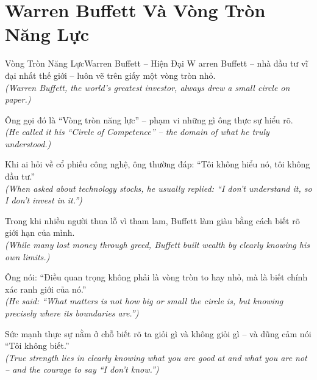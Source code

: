 \section{Warren Buffett Và Vòng Tròn Năng Lực}
\begin{truyen}{Vòng Tròn Năng Lực}{Warren Buffett -- Hiện Đại}
W arren Buffett -- nhà đầu tư vĩ đại nhất thế giới -- luôn vẽ trên giấy một vòng tròn nhỏ.\\
\textit{(Warren Buffett, the world's greatest investor, always drew a small circle on paper.)}

Ông gọi đó là ``Vòng tròn năng lực'' -- phạm vi những gì ông thực sự hiểu rõ.\\
\textit{(He called it his ``Circle of Competence'' -- the domain of what he truly understood.)}

Khi ai hỏi về cổ phiếu công nghệ, ông thường đáp: ``Tôi không hiểu nó, tôi không đầu tư.''\\
\textit{(When asked about technology stocks, he usually replied: ``I don't understand it, so I don't invest in it.'')}

Trong khi nhiều người thua lỗ vì tham lam, Buffett làm giàu bằng cách biết rõ giới hạn của mình.\\
\textit{(While many lost money through greed, Buffett built wealth by clearly knowing his own limits.)}

Ông nói: ``Điều quan trọng không phải là vòng tròn to hay nhỏ, mà là biết chính xác ranh giới của nó.''\\
\textit{(He said: ``What matters is not how big or small the circle is, but knowing precisely where its boundaries are.'')}

\end{truyen}
\begin{baihoc}
  Sức mạnh thực sự nằm ở chỗ biết rõ ta giỏi gì và không giỏi gì -- và dũng cảm nói ``Tôi không biết.''\\
  \textit{(True strength lies in clearly knowing what you are good at and what you are not -- and the courage to say ``I don't know.'')}
\end{baihoc}

